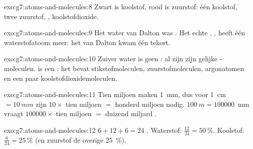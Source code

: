 \begin{solution}{exo:g7:atoms-and-molecules:8}
Zwart is koolstof, rood is zuurstof: één koolstof, twee zuurstof,
, koolstofdioxide.
\end{solution}

\begin{solution}{exo:g7:atoms-and-molecules:9}
Het water van Dalton was . Het echte , , heeft
één waterstofatoom meer: het  van Dalton kwam één  tekort.
\end{solution}

\begin{solution}{exo:g7:atoms-and-molecules:10}
Zuiver water is geen : al zijn  zijn gelijke
-moleculen.  is een : het bevat stikstofmoleculen,
zuurstofmoleculen, argonatomen en een paar koolstofdioxidemoleculen.
\end{solution}

\begin{solution}{exo:g7:atoms-and-molecules:11}
Tien miljoen  maken \qty{1}{mm}, dus voor \qty{1}{cm} $= \qty{10}{mm}$
zijn $10 \times$ tien miljoen $=$ honderd miljoen  nodig.
$\qty{100}{m} = \num{100000}$~mm vraagt $\num{100000}\times$ tien miljoen
$=$ duizend miljard .
\end{solution}

\begin{solution}{exo:g7:atoms-and-molecules:12}
$6 + 12 + 6 = 24$ . Waterstof: $\frac{12}{24} = \qty{50}{\percent}$.
Koolstof: $\frac{6}{24} = \qty{25}{\percent}$ (en zuurstof de overige
\qty{25}{\percent}).
\end{solution}

